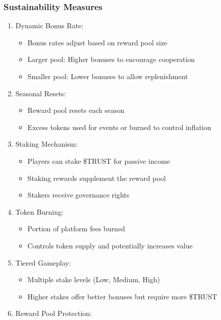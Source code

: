 \documentclass[]{article}
\begin{document}
\hypertarget{sustainability-measures}{%
\subsubsection{Sustainability
Measures}\label{sustainability-measures}}

\begin{enumerate}
\def\labelenumi{\arabic{enumi}.}
\tightlist
\item
  Dynamic Bonus Rate:

  \begin{itemize}
  \tightlist
  \item
    Bonus rates adjust based on reward pool size
  \item
    Larger pool: Higher bonuses to encourage cooperation
  \item
    Smaller pool: Lower bonuses to allow replenishment
  \end{itemize}
\item
  Seasonal Resets:

  \begin{itemize}
  \tightlist
  \item
    Reward pool resets each season
  \item
    Excess tokens used for events or burned to control inflation
  \end{itemize}
\item
  Staking Mechanism:

  \begin{itemize}
  \tightlist
  \item
    Players can stake \$TRUST for passive income
  \item
    Staking rewards supplement the reward pool
  \item
    Stakers receive governance rights
  \end{itemize}
\item
  Token Burning:

  \begin{itemize}
  \tightlist
  \item
    Portion of platform fees burned
  \item
    Controls token supply and potentially increases value
  \end{itemize}
\item
  Tiered Gameplay:

  \begin{itemize}
  \tightlist
  \item
    Multiple stake levels (Low, Medium, High)
  \item
    Higher stakes offer better bonuses but require more \$TRUST
  \end{itemize}
\item
  Reward Pool Protection:


\end{enumerate}
\end{document}

